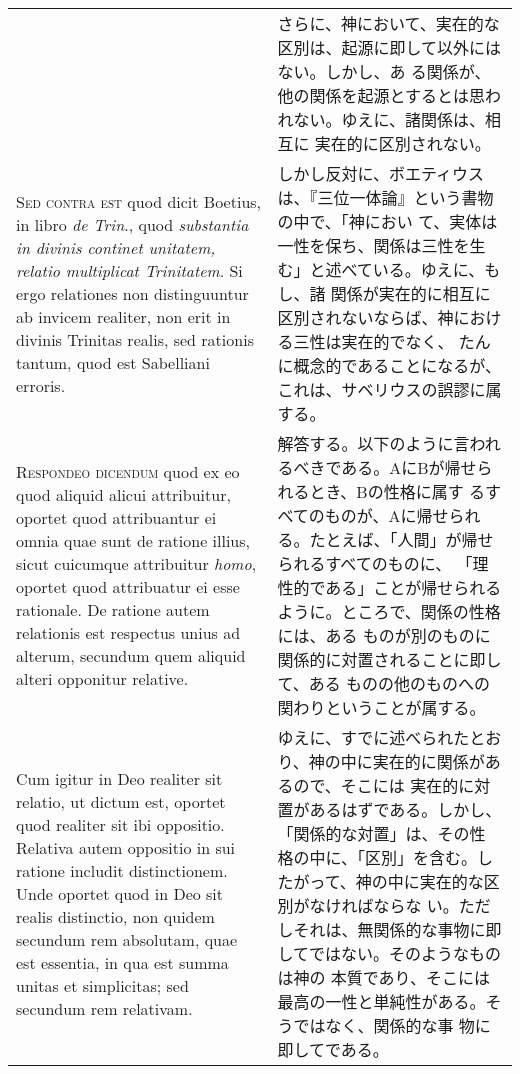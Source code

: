 \documentclass[10pt]{jsarticle} %
\begin{document}
\begin{longtable}{p{21em}p{21em}}
&

さらに、神において、実在的な区別は、起源に即して以外にはない。しかし、あ
 る関係が、他の関係を起源とするとは思われない。ゆえに、諸関係は、相互に
 実在的に区別されない。

\\



{\scshape Sed contra est} quod dicit Boetius, in libro {\itshape de Trin}., quod {\itshape substantia in
divinis continet unitatem, relatio multiplicat Trinitatem}. Si ergo
relationes non distinguuntur ab invicem realiter, non erit in divinis
Trinitas realis, sed rationis tantum, quod est Sabelliani erroris.


&

しかし反対に、ボエティウスは、『三位一体論』という書物の中で、「神におい
 て、実体は一性を保ち、関係は三性を生む」と述べている。ゆえに、もし、諸
 関係が実在的に相互に区別されないならば、神における三性は実在的でなく、
 たんに概念的であることになるが、これは、サベリウスの誤謬に属する。


\\



{\scshape Respondeo dicendum} quod ex eo quod aliquid alicui attribuitur, oportet
quod attribuantur ei omnia quae sunt de ratione illius, sicut cuicumque
attribuitur {\itshape homo}, oportet quod attribuatur ei esse rationale. De ratione
autem relationis est respectus unius ad alterum, secundum quem aliquid
alteri opponitur relative. 

&

解答する。以下のように言われるべきである。AにBが帰せられるとき、Bの性格に属す
 るすべてのものが、Aに帰せられる。たとえば、「人間」が帰せられるすべてのものに、
 「理性的である」ことが帰せられるように。ところで、関係の性格には、ある
 ものが別のものに関係的に対置されることに即して、ある
 ものの他のものへの関わりということが属する。



\\

Cum igitur in Deo realiter sit relatio, ut
dictum est, oportet quod realiter sit ibi oppositio. Relativa autem
oppositio in sui ratione includit distinctionem. Unde oportet quod in
Deo sit realis distinctio, non quidem secundum rem absolutam, quae est
essentia, in qua est summa unitas et simplicitas; sed secundum rem
relativam.


&

ゆえに、すでに述べられたとおり、神の中に実在的に関係があるので、そこには
 実在的に対置があるはずである。しかし、「関係的な対置」は、その性
 格の中に、「区別」を含む。したがって、神の中に実在的な区別がなければならな
 い。ただしそれは、無関係的な事物に即してではない。そのようなものは神の
 本質であり、そこには最高の一性と単純性がある。そうではなく、関係的な事
 物に即してである。



\end{longtable}
\end{document}
